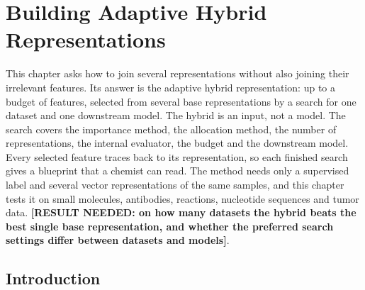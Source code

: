 \chapter{Building Adaptive Hybrid Representations}\label{chap:method}

This chapter asks how to join several representations without also joining their irrelevant features. Its answer is the adaptive hybrid representation: up to a budget of features, selected from several base representations by a search for one dataset and one downstream model. The hybrid is an input, not a model. The search covers the importance method, the allocation method, the number of representations, the internal evaluator, the budget and the downstream model. Every selected feature traces back to its representation, so each finished search gives a blueprint that a chemist can read. The method needs only a supervised label and several vector representations of the same samples, and this chapter tests it on small molecules, antibodies, reactions, nucleotide sequences and tumor data. \textbf{[RESULT NEEDED: on how many datasets the hybrid beats the best single base representation, and whether the preferred search settings differ between datasets and models]}.


\section{Introduction}

